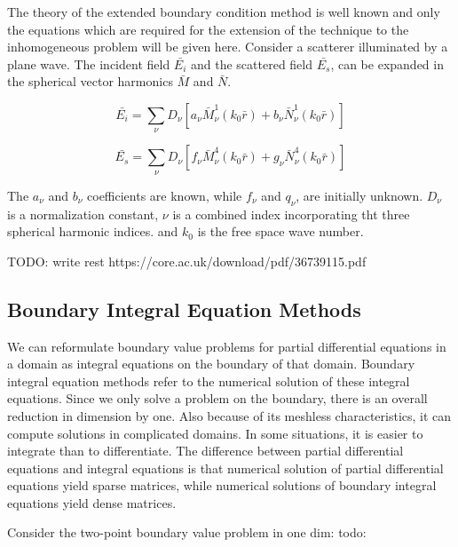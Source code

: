 \documentclass[a4paper,12pt]{report}
\begin{document}
The theory of the extended boundary condition
method is well known and only the equations
which are required for the extension of the technique to the inhomogeneous problem will be given
here.
Consider a scatterer illuminated by a plane
wave. The incident field $\bar{E_i}$ and the scattered field
$\bar{E_s}$, can be expanded in the spherical vector harmonics $\bar{M}$ and $\bar{N}$.

\begin{equation}
  \bar{E_i} = \sum_{\nu}D_{\nu}[a_{\nu}\bar{M}_{\nu}^1(k_0\bar{r})+b_{\nu}\bar{N}_{\nu}^1(k_0\bar{r})]
\end{equation}

\begin{equation}
  \bar{E_s} = \sum_{\nu}D_{\nu}[f_{\nu}\bar{M}_{\nu}^4(k_0\bar{r})+g_{\nu}\bar{N}_{\nu}^4(k_0\bar{r})]
\end{equation}

The $a_{\nu}$ and $b_{\nu}$ coefficients are known, while $f_{\nu}$ and
$q_{\nu}$, are initially unknown. $D_{\nu}$ is a normalization
constant, $\nu$ is a combined index incorporating tht
three spherical harmonic indices. and $k_0$ is the free space wave number.

TODO: write rest https://core.ac.uk/download/pdf/36739115.pdf

\subsection{Boundary Integral Equation Methods}

We can reformulate boundary value problems for partial differential equations in a
domain as integral equations on the boundary of that domain.
Boundary integral equation methods refer to the numerical
solution of these integral equations.
Since we only solve a problem on the boundary, there is an
overall reduction in dimension by one.
Also because of its meshless characteristics,
it can compute solutions in complicated domains.
In some situations, it is easier to integrate than to differentiate.
The difference between partial differential equations and integral equations is that
numerical solution of partial differential equations yield sparse matrices, while
numerical solutions of boundary integral equations yield dense
matrices.

Consider the two-point boundary value problem in one dim: todo: %
\end{document}
